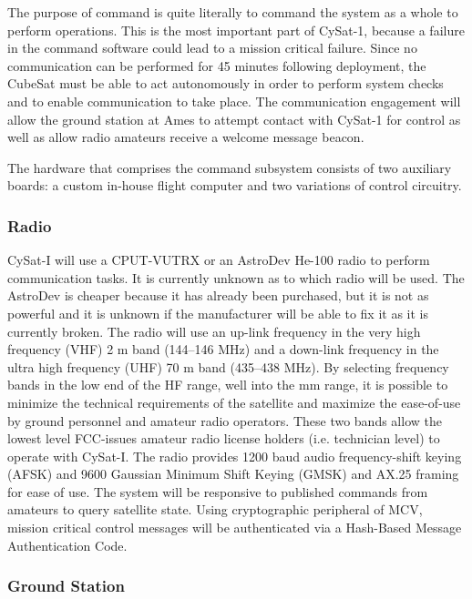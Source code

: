 \documentclass[12pt]{article}
\begin{document}
The purpose of command is quite literally to command the system as a whole to perform operations. This is the most important part of CySat-1, because a failure in the command software could lead to a mission critical failure. Since no communication can be performed for 45 minutes following deployment, the CubeSat must be able to act autonomously in order to perform system checks and to enable communication to take place. The communication engagement will allow the ground station at Ames to attempt contact with CySat-1 for control as well as allow radio amateurs receive a welcome message beacon.

The hardware that comprises the command subsystem consists of two auxiliary boards: a custom in-house flight computer and two variations of control circuitry.

\subsubsection{Radio}

CySat-I will use a CPUT-VUTRX or an AstroDev He-100 radio to perform communication tasks. It is currently unknown as to which radio will be used. The AstroDev is cheaper because it has already been purchased, but it is not as powerful and it is unknown if the manufacturer will be able to fix it as it is currently broken. The radio will use an up-link frequency in the very high frequency (VHF) 2 \si{\meter} band (\numrange{144}{146} \si{\mega\hertz}) and a down-link frequency in the ultra high frequency (UHF) 70 \si{\meter} band (\numrange{435}{438} \si{\mega\hertz}). By selecting frequency bands in the low end of the HF range, well into the mm range, it is possible to minimize the technical requirements of the satellite and maximize the ease-of-use by ground personnel and amateur radio operators. These two bands allow the lowest level FCC-issues amateur radio license holders (i.e. technician level) to operate with CySat-I. The radio provides 1200 baud audio frequency-shift keying (AFSK) and 9600 Gaussian Minimum Shift Keying (GMSK) and AX.25 framing for ease of use. The system will be responsive to published commands from amateurs to query satellite state. Using cryptographic peripheral of MCV, mission critical control messages will be authenticated via a Hash-Based Message Authentication Code.

\subsubsection{Ground Station}
\end{document}
